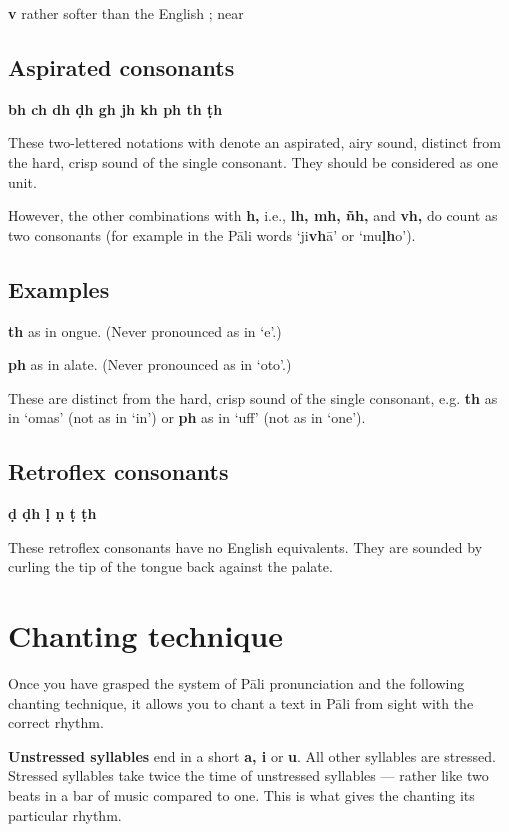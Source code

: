 \textbf{v} rather softer than the English ; near 

\subsection{Aspirated consonants}

\textbf{bh ch dh ḍh gh jh kh ph th ṭh}

These two-lettered notations with  denote an aspirated, airy sound,
distinct from the hard, crisp sound of the single consonant. They should be
considered as one unit.

However, the other combinations with \textbf{h,} i.e., \textbf{lh, mh, ñh,} and
\textbf{vh,} do count as two consonants (for example in the Pāli words
‘ji\textbf{vh}ā’ or ‘mu\textbf{ḷh}o’).

\subsection{Examples}

\textbf{th} as  in ongue. (Never pronounced as in `e'.)

\textbf{ph} as  in alate. (Never pronounced as in `oto'.)

These are distinct from the hard, crisp sound of the single consonant, e.g.
\textbf{th} as in `omas' (not as in `in') or \textbf{ph} as
in `uff' (not as in `one').

\subsection{Retroflex consonants}

\textbf{ḍ ḍh ḷ ṇ ṭ ṭh}

These retroflex consonants have no English equivalents. They are sounded
by curling the tip of the tongue back against the palate.

\section*{Chanting technique}

Once you have grasped the system of Pāli pronunciation and the following
chanting technique, it allows you to chant a text in Pāli from sight
with the correct rhythm.

\textbf{Unstressed syllables} end in a short \textbf{a, i} or
\textbf{u}. All other syllables are stressed. Stressed syllables take
twice the time of unstressed syllables --- rather like two beats in a bar
of music compared to one. This is what gives the chanting its particular
rhythm.

